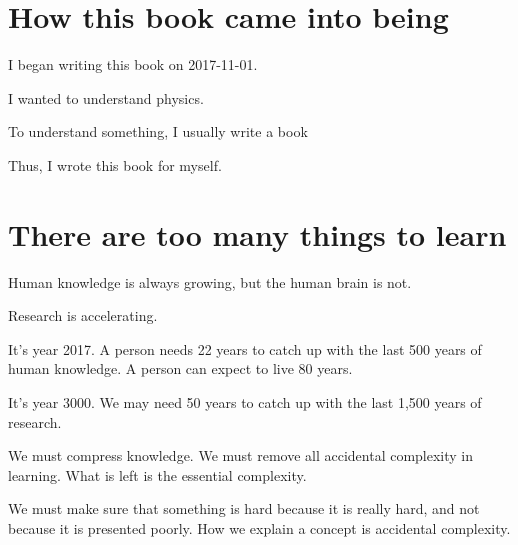 \section{How this book came into being}

I began writing this book on 2017-11-01.

I wanted to understand physics.

To understand something, I usually write a book

Thus, I wrote this book for myself.

\section{There are too many things to learn}

Human knowledge is always growing,
but the human brain is not.

Research is accelerating.

It's year 2017.
A person needs 22 years to catch up
with the last 500 years of human knowledge.
A person can expect to live 80 years.

It's year 3000.
We may need 50 years to catch up with the last 1,500 years of research.

We must compress knowledge.
We must remove all accidental complexity in learning.
What is left is the essential complexity.

We must make sure that something is hard because it is really hard,
and not because it is presented poorly.
How we explain a concept is accidental complexity.
